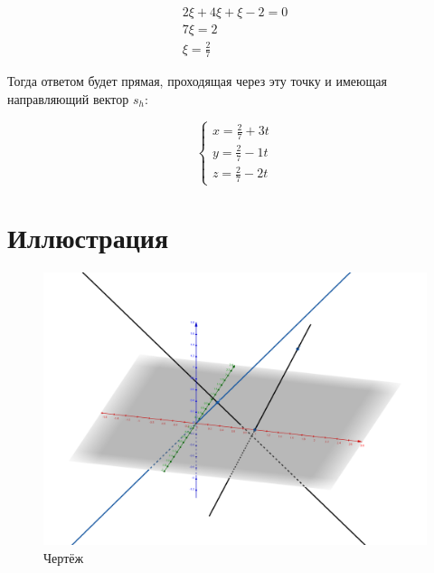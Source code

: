 \documentclass[12pt, a4paper]{article}
\begin{document}
    \begin{gather}
            2\xi + 4\xi + \xi − 2 = 0 \\
            7\xi = 2 \\
            \xi = \frac{2}{7}
    \end{gather}

    Тогда ответом будет прямая, проходящая через эту точку и имеющая направляющий вектор $s_h$:

    \begin{equation}
        \begin{cases}
            x = \frac{2}{7} + 3t \\
            y = \frac{2}{7} - 1t\\
            z = \frac{2}{7} - 2t
        \end{cases}
    \end{equation}

    \section{Иллюстрация}
    \begin{figure}
        \centering
        \includegraphics[width=\paperwidth]{resources/1.5_figure.png}
        \caption{Чертёж}
        \label{fig:main_figure}
    \end{figure}
    \FloatBarrier
\end{document}
